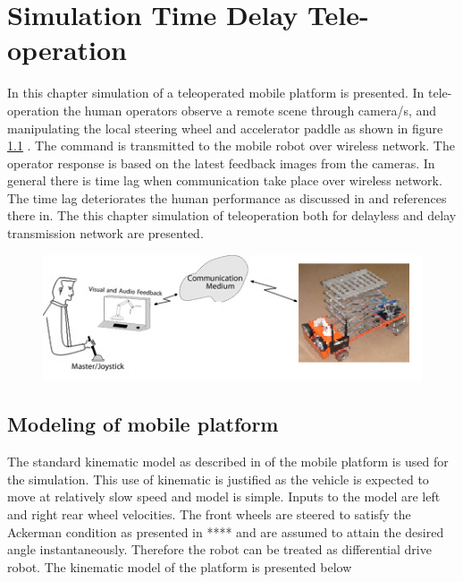 
\chapter{Simulation Time Delay Tele-operation}
\label{c7_DI_equimomental}
In this chapter simulation of a teleoperated mobile platform is presented. In tele-operation the human operators observe a remote scene through camera/s, and manipulating the local steering wheel and accelerator paddle as shown in figure \ref{fig:teleoperation} . The command is transmitted to the mobile robot over wireless network. The operator response is based on the latest feedback images from the cameras. In general there is time lag when communication take place over wireless network. The time lag deteriorates the human performance as discussed in \cite{chen2007human} and references there in.  The this chapter simulation of teleoperation both for delayless and delay transmission network are presented.
\begin{figure}
	\includegraphics[width=\linewidth,keepaspectratio]{Chapter6/fig/teleoperation}
	\label{fig:teleoperation} 
\end{figure}

\section{Modeling of mobile platform}
The standard kinematic model as described in \cite{campion1996structural} of the mobile platform is used for the simulation. This use of kinematic is justified as  the vehicle is expected to move at relatively slow speed and model is simple. Inputs to the model are left and right rear wheel velocities. The front wheels are steered to satisfy the Ackerman condition as presented in **** and are assumed to attain the desired angle instantaneously. Therefore the robot can be treated as differential drive robot.  The kinematic model of the platform is presented below

